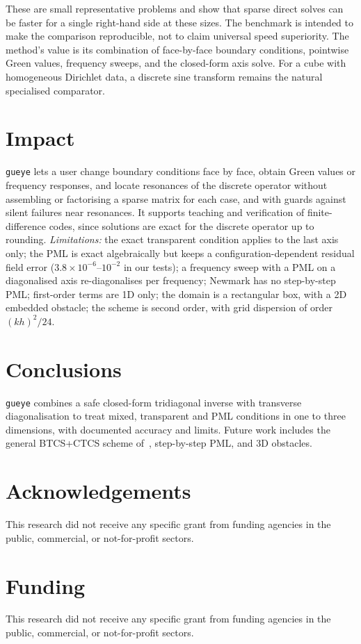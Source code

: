 \documentclass[preprint,12pt,a4paper]{elsarticle}
\newcommand{\gueye}{\texttt{gueye}}
\begin{document}
These are small representative problems and show that sparse direct solves can be faster for a single right-hand side at these sizes. The benchmark is intended to make the comparison reproducible, not to claim universal speed superiority. The method's value is its combination of face-by-face boundary conditions, pointwise Green values, frequency sweeps, and the closed-form axis solve. For a cube with homogeneous Dirichlet data, a discrete sine transform remains the natural specialised comparator.

\section{Impact}
\gueye{} lets a user change boundary conditions face by face, obtain Green values or frequency responses, and locate resonances of the discrete operator without assembling or factorising a sparse matrix for each case, and with guards against silent failures near resonances.
It supports teaching and verification of finite-difference codes, since solutions are exact for the discrete operator up to rounding.
\emph{Limitations:} the exact transparent condition applies to the last axis only; the PML is exact algebraically but keeps a configuration-dependent residual field error ($3.8\times10^{-6}$--$10^{-2}$ in our tests); a frequency sweep with a PML on a diagonalised axis re-diagonalises per frequency; Newmark has no step-by-step PML; first-order terms are 1D only; the domain is a rectangular box, with a 2D embedded obstacle; the scheme is second order, with grid dispersion of order $(kh)^2/24$.

\section{Conclusions}
\gueye{} combines a safe closed-form tridiagonal inverse with transverse diagonalisation to treat mixed, transparent and PML conditions in one to three dimensions, with documented accuracy and limits.
Future work includes the general BTCS+CTCS scheme of~\cite{Gueye2021}, step-by-step PML, and 3D obstacles.

\section*{Acknowledgements}
This research did not receive any specific grant from funding agencies in the public, commercial, or not-for-profit sectors.

\section*{Funding}
This research did not receive any specific grant from funding agencies in the public, commercial, or not-for-profit sectors.
\end{document}
